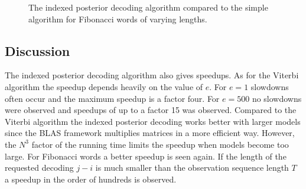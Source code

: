 \begin{figure}
  \centering
  
  \caption{The indexed posterior decoding algorithm compared to the simple
    algorithm for Fibonacci words of varying lengths.}
  \label{fig:indexed_posterior_fib_speedup_vs_T}
\end{figure}

\subsection{Discussion}

The indexed posterior decoding algorithm also gives speedups. As for the
Viterbi algorithm the speedup depends heavily on the value of $e$. For $e = 1$
slowdowns often occur and the maximum speedup is a factor four. For $e = 500$
no slowdowns were observed and speedups of up to a factor 15 was observed.
Compared to the Viterbi algorithm the indexed posterior decoding works better
with larger models since the BLAS framework multiplies matrices in a more
efficient way. However, the $N^3$ factor of the running time limits the speedup
when models become too large. For Fibonacci words a better speedup is seen
again. If the length of the requested decoding $j - i$ is much smaller than the
observation sequence length $T$ a speedup in the order of hundreds is observed.

